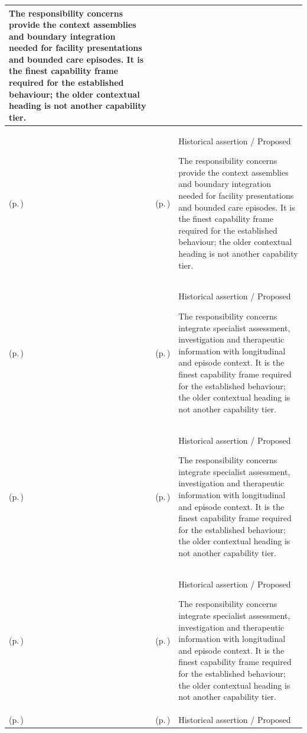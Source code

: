 \begin{longtable}{|>{\raggedright\arraybackslash}p{0.27\TableWidth}|>{\raggedright\arraybackslash}p{0.27\TableWidth}|>{\raggedright\arraybackslash}p{0.46\TableWidth}|}
The responsibility concerns provide the context assemblies and boundary integration needed for facility presentations and bounded care episodes. It is the finest capability frame required for the established behaviour; the older contextual heading is not another capability tier.\\\hline
\nameref{cap:bec-facility-episodic-care-integration} (p.\,\pageref{cap:bec-facility-episodic-care-integration}) & \nameref{cap:bec-surgical-procedural-care} (p.\,\pageref{cap:bec-surgical-procedural-care}) & Historical assertion / Proposed

The responsibility concerns provide the context assemblies and boundary integration needed for facility presentations and bounded care episodes. It is the finest capability frame required for the established behaviour; the older contextual heading is not another capability tier.\\\hline
\nameref{cap:bec-specialist-clinical-context-integration} (p.\,\pageref{cap:bec-specialist-clinical-context-integration}) & \nameref{cap:bec-diagnostic-services} (p.\,\pageref{cap:bec-diagnostic-services}) & Historical assertion / Proposed

The responsibility concerns integrate specialist assessment, investigation and therapeutic information with longitudinal and episode context. It is the finest capability frame required for the established behaviour; the older contextual heading is not another capability tier.\\\hline
\nameref{cap:bec-specialist-clinical-context-integration} (p.\,\pageref{cap:bec-specialist-clinical-context-integration}) & \nameref{cap:bec-therapeutic-services} (p.\,\pageref{cap:bec-therapeutic-services}) & Historical assertion / Proposed

The responsibility concerns integrate specialist assessment, investigation and therapeutic information with longitudinal and episode context. It is the finest capability frame required for the established behaviour; the older contextual heading is not another capability tier.\\\hline
\nameref{cap:bec-specialist-clinical-context-integration} (p.\,\pageref{cap:bec-specialist-clinical-context-integration}) & \nameref{cap:bec-medication-therapy} (p.\,\pageref{cap:bec-medication-therapy}) & Historical assertion / Proposed

The responsibility concerns integrate specialist assessment, investigation and therapeutic information with longitudinal and episode context. It is the finest capability frame required for the established behaviour; the older contextual heading is not another capability tier.\\\hline
\nameref{cap:bec-specialist-clinical-context-integration} (p.\,\pageref{cap:bec-specialist-clinical-context-integration}) & \nameref{cap:bec-allied-health} (p.\,\pageref{cap:bec-allied-health}) & Historical assertion / Proposed


\end{longtable}
